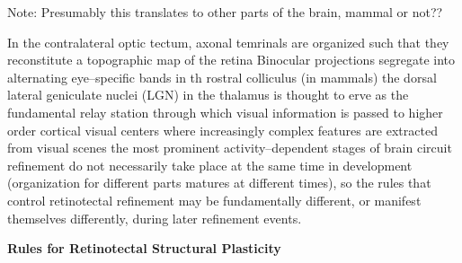 \documentclass[11pt, a4paper, oneside]{article}   	%
\begin{document}
Note: Presumably this translates to other parts of the brain, mammal or not??

\begin{outline}
  \point In the contralateral optic tectum, axonal temrinals are organized such that they reconstitute a topographic map of the retina
    \point Binocular projections segregate into alternating eye--specific bands in th rostral colliculus (in mammals)
    \point the dorsal lateral geniculate nuclei (LGN) in the thalamus is thought to erve as the fundamental relay station through which visual information is passed to higher order cortical visual centers where increasingly complex features are extracted from visual scenes
    \point the most prominent activity--dependent stages of brain circuit refinement do not necessarily take place at the same time in development (organization for different parts matures at different times), so the rules that control retinotectal refinement may be fundamentally different, or manifest themselves differently, during later refinement events.
\end{outline}

\textbf{Rules for Retinotectal Structural Plasticity}
\end{document}
